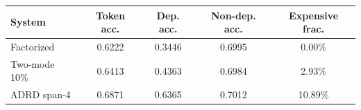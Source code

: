 \begin{tabular}{lcccc}
\toprule
System & Token acc. & Dep. acc. & Non-dep. acc. & Expensive frac.\\
\midrule
Factorized & 0.6222 & 0.3446 & 0.6995 & 0.00\%\\
Two-mode 10\% & 0.6413 & 0.4363 & 0.6984 & 2.93\%\\
ADRD span-4 & 0.6871 & 0.6365 & 0.7012 & 10.89\%\\
\bottomrule
\end{tabular}
